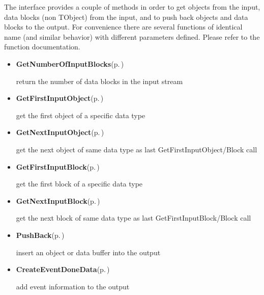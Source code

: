 The interface provides a couple of methods in order to get objects from the input, data blocks (non TObject) from the input, and to push back objects and data blocks to the output. For convenience there are several functions of identical name (and similar behavior) with different parameters defined. Please refer to the function documentation.\begin{itemize}
\item {\bf Get\-Number\-Of\-Input\-Blocks}{\rm (p.\,\pageref{classAliHLTComponent_b12})} \par
 return the number of data blocks in the input stream\item {\bf Get\-First\-Input\-Object}{\rm (p.\,\pageref{classAliHLTComponent_b13})} \par
 get the first object of a specific data type\item {\bf Get\-Next\-Input\-Object}{\rm (p.\,\pageref{classAliHLTComponent_b15})} \par
 get the next object of same data type as last Get\-First\-Input\-Object/Block call\item {\bf Get\-First\-Input\-Block}{\rm (p.\,\pageref{classAliHLTComponent_b18})} \par
 get the first block of a specific data type\item {\bf Get\-Next\-Input\-Block}{\rm (p.\,\pageref{classAliHLTComponent_b21})} \par
 get the next block of same data type as last Get\-First\-Input\-Block/Block call\item {\bf Push\-Back}{\rm (p.\,\pageref{classAliHLTComponent_b23})} \par
 insert an object or data buffer into the output\item {\bf Create\-Event\-Done\-Data}{\rm (p.\,\pageref{classAliHLTComponent_b28})} \par
 add event information to the output\end{itemize}


